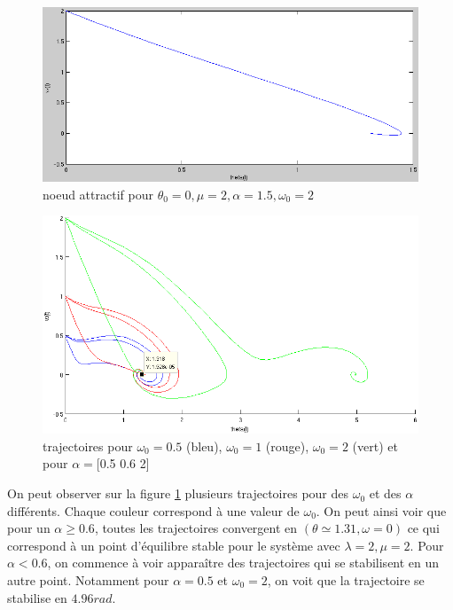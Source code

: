 \documentclass[11pt]{article}
\begin{document}
\begin{figure}[h!]
	\centering
	\includegraphics[scale=0.59]{Figures/rapport_traj_noeud.png}
	\caption{noeud attractif pour $\theta_0=0, \mu=2, \alpha=1.5,\omega_0=2$}
\end{figure}

\begin{figure}[h!]
	\centering
	\includegraphics[scale=0.6]{Figures/rapport_stab.png}
	\caption{trajectoires pour $\omega_0=0.5$ (bleu), $\omega_0=1$ (rouge), $\omega_0=2$ (vert) et pour $\alpha=$[0.5 0.6 2]}
	\label{fig:stab}
\end{figure}

On peut observer sur la figure \ref{fig:stab} plusieurs trajectoires pour des $\omega_0$ et des $\alpha$ différents. Chaque couleur correspond à une valeur de $\omega_0$. On peut ainsi voir que pour un $\alpha \geq 0.6$, toutes les trajectoires convergent en $(\theta \simeq 1.31, \omega = 0)$ ce qui correspond à un point d'équilibre stable pour le système avec $\lambda=2, \mu=2$. Pour $\alpha < 0.6$, on commence à voir apparaître des trajectoires qui se stabilisent en un autre point. Notamment pour $\alpha=0.5$ et $\omega_0 = 2$, on voit que la trajectoire se stabilise en $4.96 rad$.
\end{document}
